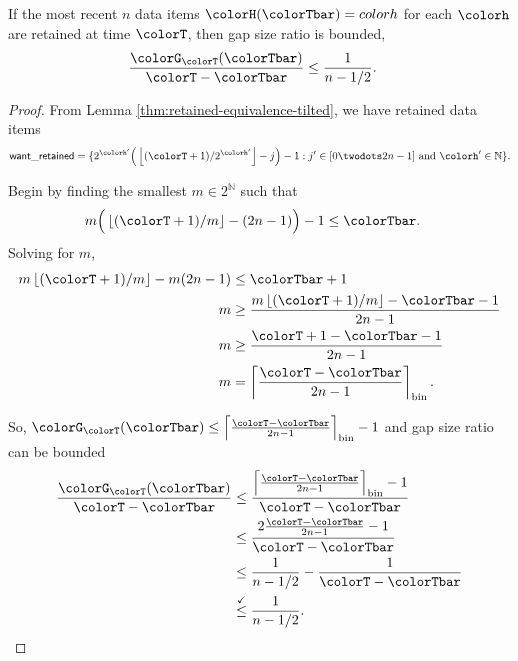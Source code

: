 \begin{lemma}
\label{thm:gap-size-ratio-tilted}
If the most recent $n$ data items $\colorH(\colorTbar) = colorh$ for each \hv{} $\colorh$ are retained at time $\colorT$, then gap size ratio is bounded,
\begin{align*}
\frac{\colorG_{\colorT}(\colorTbar)}{\colorT - \colorTbar}
&\leq
\frac{1}{n - 1/2}.
\end{align*}
\end{lemma}
\begin{proof}

From Lemma \ref{thm:retained-equivalence-tilted}, we have retained data items
\begin{align*}
\mathsf{want\_retained} =
\{
2^{\colorh'}\Big(\left\lfloor (\colorT + 1) / 2^{\colorh'} \right\rfloor - j\Big) - 1
  :
  j' \in [0 \twodots 2n-1]
  \text{ and }
  \colorh' \in \mathbb{N}
\}.
\end{align*}

Begin by finding the smallest $m \in 2^{\mathbb{N}}$ such that
\begin{align*}
m\Big( \left\lfloor (\colorT + 1)/m \right\rfloor - (2n - 1)\Big) - 1
&\leq
\colorTbar.
\end{align*}
Solving for $m$,
\begin{align*}
m \left\lfloor (\colorT + 1)/m \right\rfloor - m(2n - 1)
&\leq \colorTbar + 1\\
m
&\geq \frac{
m \left\lfloor (\colorT + 1)/m \right\rfloor - \colorTbar - 1
}{2n - 1}\\
m
&\geq \frac{
\colorT + 1 - \colorTbar - 1
}{2n - 1}\\
m
&= \left\lceil \frac{\colorT - \colorTbar}{2n - 1} \right\rceil_{\mathrm{bin}}.
\end{align*}

So, $\colorG_{\colorT}(\colorTbar) \leq \left\lceil \frac{\colorT - \colorTbar}{2n - 1} \right\rceil_{\mathrm{bin}} - 1$ and gap size ratio can be bounded
\begin{align*}
\frac{\colorG_{\colorT}(\colorTbar)}{\colorT - \colorTbar}
&\leq
\frac{
\left\lceil \frac{\colorT - \colorTbar}{2n - 1} \right\rceil_{\mathrm{bin}} - 1
}{
\colorT - \colorTbar
}\\
&\leq
\frac{
2\frac{\colorT - \colorTbar}{2n - 1}
 - 1
}{
\colorT - \colorTbar
}\\
&\leq
\frac{1
}{n - 1/2}
-
\frac{1
}{
\colorT - \colorTbar
}\\
&\stackrel{\checkmark}{\leq}
\frac{1}{n - 1/2}.
\end{align*}

\end{proof}
